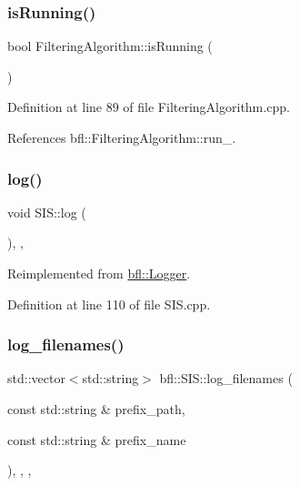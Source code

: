 \subsubsection{\texorpdfstring{is\+Running()}{isRunning()}}
{\footnotesize\ttfamily bool Filtering\+Algorithm\+::is\+Running (\begin{DoxyParamCaption}{ }\end{DoxyParamCaption})\hspace{0.3cm}{\ttfamily [inherited]}}



Definition at line 89 of file Filtering\+Algorithm.\+cpp.



References bfl\+::\+Filtering\+Algorithm\+::run\+\_\+.

\mbox{\label{classbfl_1_1SIS_aeb0b87af1cc1fc4b616989ef489ecccc}} 
\subsubsection{\texorpdfstring{log()}{log()}}
{\footnotesize\ttfamily void S\+I\+S\+::log (\begin{DoxyParamCaption}{ }\end{DoxyParamCaption})\hspace{0.3cm}{\ttfamily [override]}, {\ttfamily [protected]}, {\ttfamily [virtual]}}



Reimplemented from \mbox{\hyperlink{classbfl_1_1Logger_ad44f46593cb8c4c87c1178eb326e2f64}{bfl\+::\+Logger}}.



Definition at line 110 of file S\+I\+S.\+cpp.

\mbox{\label{classbfl_1_1SIS_a805aef60946bfcaae4f65473dc7bd5ae}} 
\subsubsection{\texorpdfstring{log\+\_\+filenames()}{log\_filenames()}}
{\footnotesize\ttfamily std\+::vector$<$std\+::string$>$ bfl\+::\+S\+I\+S\+::log\+\_\+filenames (\begin{DoxyParamCaption}\item[{const std\+::string \&}]{prefix\+\_\+path,  }\item[{const std\+::string \&}]{prefix\+\_\+name }\end{DoxyParamCaption})\hspace{0.3cm}{\ttfamily [inline]}, {\ttfamily [override]}, {\ttfamily [protected]}, {\ttfamily [virtual]}}



